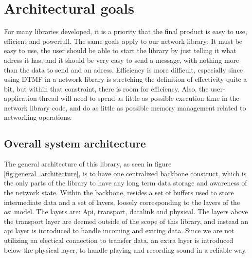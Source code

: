 \section{Architectural goals}
For many libraries developed, it is a priority that the final product is easy to use, efficient and powerfull.  The same goals apply to our network library: It must be easy to use, the user should be able to start the library by just telling it what adress it has, and it should be very easy to send a message, with nothing more than the data to send and an adress. Efficiency is more difficult, especially since using DTMF in a network library is stretching the definition of effectivity quite a bit, but within that constraint, there is room for efficiency.
Also, the user-application thread will need to spend as little as possible execution time in the network library code, and do as little as possible memory management related to networking operations. 



\subsection{Overall system architecture}
The general architecture of this library, as seen in figure \ref{fig:general_architecture}, is to have one centralized backbone construct, which is the only parts of the library to have any long term data storage and awareness of the network state. 
Within the backbone, resides a set of buffers used to store intermediate data and a set of layers, loosely corresponding to the layers of the osi model.
The layers are: Api, transport, datalink and physical.
The layers above the transport layer are deemed outside of the scope of this library, and instead an api layer is introduced to handle incoming and exiting data. Since we are not utilizing an electical connection to transfer data, an extra layer is introduced below the physical layer, to handle playing and recording sound in a reliable way.









